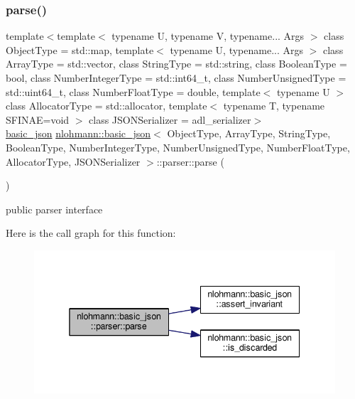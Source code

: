 \subsubsection{\texorpdfstring{parse()}{parse()}}
{\footnotesize\ttfamily template$<$template$<$ typename U, typename V, typename... Args $>$ class Object\+Type = std\+::map, template$<$ typename U, typename... Args $>$ class Array\+Type = std\+::vector, class String\+Type  = std\+::string, class Boolean\+Type  = bool, class Number\+Integer\+Type  = std\+::int64\+\_\+t, class Number\+Unsigned\+Type  = std\+::uint64\+\_\+t, class Number\+Float\+Type  = double, template$<$ typename U $>$ class Allocator\+Type = std\+::allocator, template$<$ typename T, typename S\+F\+I\+N\+A\+E=void $>$ class J\+S\+O\+N\+Serializer = adl\+\_\+serializer$>$ \\
\hyperlink{classnlohmann_1_1basic__json}{basic\+\_\+json} \hyperlink{classnlohmann_1_1basic__json}{nlohmann\+::basic\+\_\+json}$<$ Object\+Type, Array\+Type, String\+Type, Boolean\+Type, Number\+Integer\+Type, Number\+Unsigned\+Type, Number\+Float\+Type, Allocator\+Type, J\+S\+O\+N\+Serializer $>$\+::parser\+::parse (\begin{DoxyParamCaption}{ }\end{DoxyParamCaption})\hspace{0.3cm}{\ttfamily [inline]}}



public parser interface 

Here is the call graph for this function\+:\nopagebreak
\begin{figure}[H]
\begin{center}
\leavevmode
\includegraphics[width=338pt]{classnlohmann_1_1basic__json_1_1parser_ad93c24f1a1b0ac2f557e6ea34deffd63_cgraph}
\end{center}
\end{figure}
\mbox{\label{classnlohmann_1_1basic__json_1_1parser_a86e95a2b7b47c89135c41295949bcf0a}} 
